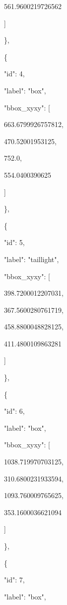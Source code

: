 \documentclass[10pt,a4paper]{article}
\begin{document}
        561.9600219726562\par
      ]\par
    \},\allowbreak{}\par
    \{\par
      "id":\allowbreak{} 4,\allowbreak{}\par
      "label":\allowbreak{} "box",\allowbreak{}\par
      "bbox\_xyxy":\allowbreak{} [\par
        663.6799926757812,\allowbreak{}\par
        470.52001953125,\allowbreak{}\par
        752.0,\allowbreak{}\par
        554.0400390625\par
      ]\par
    \},\allowbreak{}\par
    \{\par
      "id":\allowbreak{} 5,\allowbreak{}\par
      "label":\allowbreak{} "taillight",\allowbreak{}\par
      "bbox\_xyxy":\allowbreak{} [\par
        398.7200012207031,\allowbreak{}\par
        367.5600280761719,\allowbreak{}\par
        458.8800048828125,\allowbreak{}\par
        411.4800109863281\par
      ]\par
    \},\allowbreak{}\par
    \{\par
      "id":\allowbreak{} 6,\allowbreak{}\par
      "label":\allowbreak{} "box",\allowbreak{}\par
      "bbox\_xyxy":\allowbreak{} [\par
        1038.719970703125,\allowbreak{}\par
        310.6800231933594,\allowbreak{}\par
        1093.760009765625,\allowbreak{}\par
        353.1600036621094\par
      ]\par
    \},\allowbreak{}\par
    \{\par
      "id":\allowbreak{} 7,\allowbreak{}\par
      "label":\allowbreak{} "box",\allowbreak{}\par
\end{document}
